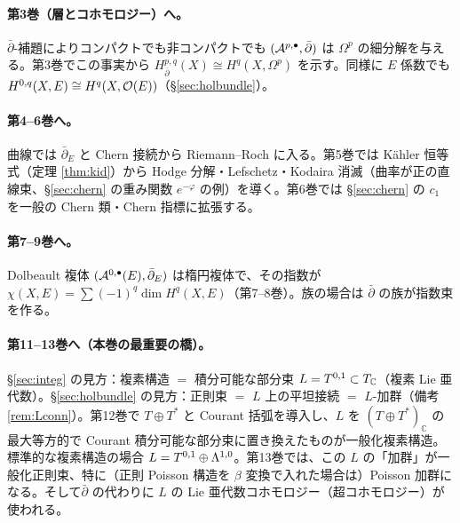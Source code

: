 \paragraph{第3巻（層とコホモロジー）へ。}$\bar\partial$-補題によりコンパクトでも非コンパクトでも $(\mathcal A^{p,\bullet},\bar\partial)$ は $\Omega^p$ の細分解を与える。第3巻でこの事実から $H^{p,q}_{\bar\partial}(X)\cong H^q(X,\Omega^p)$ を示す。同様に $E$ 係数でも $H^{0,q}(X,E)\cong H^q(X,\mathcal O(E))$（\S\ref{sec:holbundle}）。
\paragraph{第4--6巻へ。}曲線では $\bar\partial_E$ と Chern 接続から Riemann--Roch に入る。第5巻では Kähler 恒等式（定理 \ref{thm:kid}）から Hodge 分解・Lefschetz・Kodaira 消滅（曲率が正の直線束、\S\ref{sec:chern} の重み関数 $e^{-\varphi}$ の例）を導く。第6巻では \S\ref{sec:chern} の $c_1$ を一般の Chern 類・Chern 指標に拡張する。
\paragraph{第7--9巻へ。}Dolbeault 複体 $(\mathcal A^{0,\bullet}(E),\bar\partial_E)$ は楕円複体で、その指数が $\chi(X,E)=\sum(-1)^q\dim H^q(X,E)$（第7--8巻）。族の場合は $\bar\partial$ の族が指数束を作る。
\paragraph{第11--13巻へ（本巻の最重要の橋）。}\S\ref{sec:integ} の見方：複素構造 $=$ 積分可能な部分束 $L=T^{0,1}\subset T_{\mathbb C}$（複素 Lie 亜代数）。\S\ref{sec:holbundle} の見方：正則束 $=$ $L$ 上の平坦接続 $=$ $L$-加群（備考 \ref{rem:Lconn}）。第12巻で $T\oplus T^*$ と Courant 括弧を導入し、$L$ を $(T\oplus T^*)_{\mathbb C}$ の最大等方的で Courant 積分可能な部分束に置き換えたものが一般化複素構造。標準的な複素構造の場合 $L=T^{0,1}\oplus\Lambda^{1,0}$。第13巻では、この $L$ の「加群」が一般化正則束、特に（正則 Poisson 構造を $\beta$ 変換で入れた場合は）Poisson 加群になる\tQ。そして$\bar\partial$ の代わりに $L$ の Lie 亜代数コホモロジー（超コホモロジー）が使われる。
